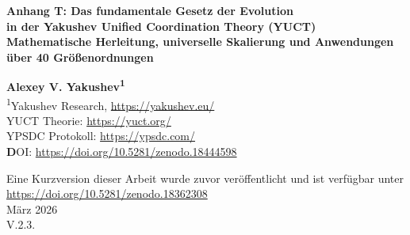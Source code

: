 \documentclass[12pt,a4paper]{article}
\theoremstyle{remark}
\begin{document}
	
	\begin{titlepage}
		\begin{center}
			\vspace*{1cm}
			
			\Huge\textbf{Anhang T: Das fundamentale Gesetz der Evolution \\ in der Yakushev Unified Coordination Theory (YUCT)} \\
			\vspace{0.5cm}
			\Large\textbf{Mathematische Herleitung, universelle Skalierung und Anwendungen über 40 Größenordnungen}
			
			\vspace{1.5cm}
			
			\Large\textbf{Alexey V. Yakushev\textsuperscript{1}} \\
			
			\vspace{0.3cm}
			\large
			\textsuperscript{1}Yakushev Research, \url{https://yakushev.eu/} \\
			
			\vspace{1cm}
			\large
			YUCT Theorie: \url{https://yuct.org/}\\
			YPSDC Protokoll: \url{https://ypsdc.com/}\\
			
			\vspace{2cm}
			\textbf DOI: \url{https://doi.org/10.5281/zenodo.18444598}\\
			
			\vspace{1cm}
			
			\vspace{0cm}
			\large 
			Eine Kurzversion dieser Arbeit wurde zuvor veröffentlicht und ist verfügbar unter\\ \url{https://doi.org/10.5281/zenodo.18362308}\\
			\vspace{1cm}
			März 2026 \\ \large V.2.3.
			
			\vspace{2cm}
			

\end{center}
\end{titlepage}
\end{document}
